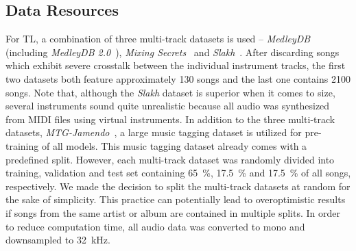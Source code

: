 \documentclass{article}
\begin{document}
\subsection{Data Resources}
\label{sec:method:data}
For TL, a combination of three multi-track datasets is used -- \textit{MedleyDB}~\cite{bittner2014medleydb} (including \textit{MedleyDB 2.0}~\cite{bittner2016medleydb2}), \textit{Mixing Secrets}~\cite{gururani2017mixingsecrets} and \textit{Slakh}~\cite{manilow2019slakh}. After discarding songs which exhibit severe crosstalk between the individual instrument tracks, the first two datasets both feature approximately 130 songs and the last one contains 2100 songs. Note that, although the \textit{Slakh} dataset is superior when it comes to size, several instruments sound quite unrealistic because all audio was synthesized from MIDI files using virtual instruments.  In addition to the three multi-track datasets, \textit{MTG-Jamendo}~\cite{bogdanov2019jamendo}, a large music tagging dataset is utilized for pre-training of all models. This music tagging dataset already comes with a predefined split. However, each multi-track dataset was randomly divided into training, validation and test set containing \SI{65}{\percent}, \SI{17.5}{\percent} and \SI{17.5}{\percent} of all songs, respectively. We made the decision to split the multi-track datasets at random for the sake of simplicity. This practice can potentially lead to overoptimistic results if songs from the same artist or album are contained in multiple splits. In order to reduce computation time, all audio data was converted to mono and downsampled to \SI{32}{\kilo\hertz}.
\end{document}
